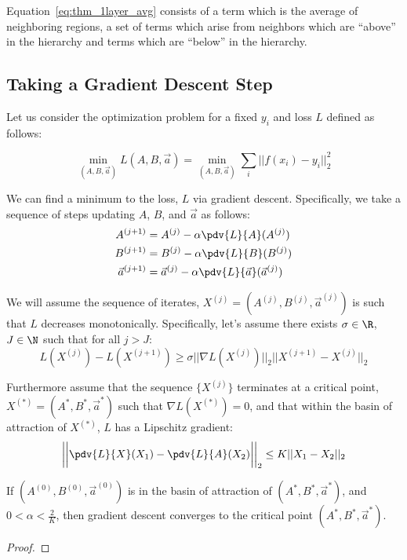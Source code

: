 Equation~\ref{eq:thm_1layer_avg} consists of a term which is the average of neighboring regions, a set of terms which arise from neighbors which are ``above'' in the hierarchy and terms which are ``below'' in the hierarchy.

\subsection{Taking a Gradient Descent Step}
Let us consider the optimization problem for a fixed $y_i$ and loss $L$ defined as follows:

\begin{equation}
    \min_{(A, B, \vec{a})} L(A, B, \vec{a}) = \min_{(A, B, \vec{a})} \sum_i || f(x_i) - y_i ||_2^2
\end{equation}

We can find a minimum to the loss, $L$ via gradient descent. Specifically, we take a sequence of steps updating $A$, $B$, and $\vec{a}$ as follows:
\begin{align}
A^{(j+1)} &= A^{(j)} - \alpha \pdv{L}{A} (A^{(j)}) \label{eq:gdesA}\\
B^{(j+1)} &= B^{(j)} - \alpha \pdv{L}{B} (B^{(j)}) \label{eq:gdesB}\\
\vec{a}^{(j+1)} &= \vec{a}^{(j)} - \alpha \pdv{L}{\vec{a}} (\vec{a}^{(j)}) \label{eq:gdesa}
\end{align}

We will assume the sequence of iterates, $X^{(j)} = (A^{(j)}, B^{(j)}, \vec{a}^{(j)})$ is such that $L$ decreases monotonically. Specifically, let's assume there exists $\sigma \in \R$, $J \in \N$ such that for all $j > J$:
\begin{equation}
    L(X^{(j)}) - L(X^{(j+1)}) \geq \sigma ||\nabla L(X^{(j)})||_2 ||X^{(j+1)} - X^{(j)}||_2
\end{equation}

Furthermore assume that the sequence $\{X^{(j)}\}$ terminates at a critical point, $X^{(\ast)} = (A^\ast, B^\ast, \vec{a}^\ast)$ such that $\nabla L(X^{(\ast)}) = 0$, and that within the basin of attraction of $X^{(\ast)}$, $L$ has a Lipschitz gradient:
\begin{equation}
    \bigg|\bigg|\pdv{L}{X} (X_1) - \pdv{L}{A} (X_2)\bigg|\bigg|_2 \leq K ||X_1 - X_2||_2 \\
\end{equation}

\begin{claim}
If $(A^{(0)}, B^{(0)}, \vec{a}^{(0)})$ is in the basin of attraction of $(A^\ast, B^\ast, \vec{a}^\ast)$, and $0 < \alpha < \frac{2}{K}$, then gradient descent converges to the critical point $(A^\ast, B^\ast, \vec{a}^\ast)$.
\end{claim}
\begin{proof}
\end{proof}




